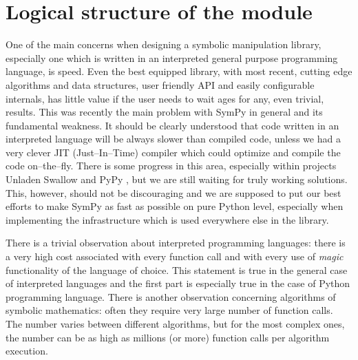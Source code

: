 \section{Logical structure of the module}

One of the main concerns when designing a symbolic manipulation library, especially one which is
written in an interpreted general purpose programming language, is speed. Even the best equipped
library, with most recent, cutting edge algorithms and data structures, user friendly API and
easily configurable internals, has little value if the user needs to wait ages for any, even
trivial, results. This was recently the main problem with SymPy in general and its fundamental
weakness. It should be clearly understood that code written in an interpreted language will be
always slower than compiled code, unless we had a very clever JIT (Just--In--Time) compiler which
could optimize and compile the code on--the--fly. There is some progress in this area, especially
within projects Unladen Swallow \cite{UnladenSwallow} and PyPy \cite{PyPy}, but we are still waiting for
truly working solutions. This, however, should not be discouraging and we are supposed to put our
best efforts to make SymPy as fast as possible on pure Python level, especially when implementing
the infrastructure which is used everywhere else in the library.

There is a trivial observation about interpreted programming languages: there is a very high cost
associated with every function call and with every use of \emph{magic} functionality of the language of
choice. This statement is true in the general case of interpreted languages and the first part is
especially true in the case of Python programming language. There is another observation concerning
algorithms of symbolic mathematics: often they require very large number of function calls. The number
varies between different algorithms, but for the most complex ones, the number can be as high as millions
(or more) function calls per algorithm execution.

